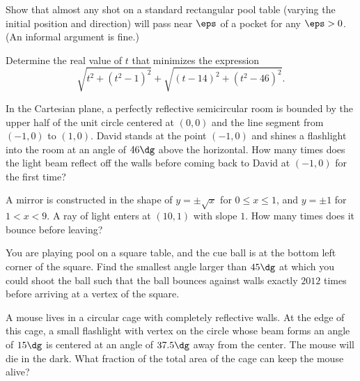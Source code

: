 \documentclass[11pt]{scrartcl}
\begin{document}
\begin{problem}
    Show that almost any shot on a standard rectangular pool table (varying the initial position and direction) will pass near $\eps$ of a pocket for any $\eps > 0$. (An informal argument is fine.)
\end{problem}

\begin{problem} %
    Determine the real value of $t$ that minimizes the expression
    \[\sqrt{t^2 + (t^2 - 1)^2} + \sqrt{(t - 14)^2 + (t^2 - 46)^2}.\]
\end{problem}

\begin{problem} %
    In the Cartesian plane, a perfectly reflective semicircular room is bounded by the upper half of the unit circle centered at $(0,0)$ and the line segment from $(-1,0)$ to $(1,0)$. David stands at the point $(-1,0)$ and shines a flashlight into the room at an angle of $46\dg$ above the horizontal. How many times does the light beam reflect off the walls before coming back to David at $(-1,0)$ for the first time?
\end{problem}

\begin{problem} %
    A mirror is constructed in the shape of $y = \pm\sqrt x$ for $0 \le x \le 1$, and $y = \pm 1$ for $1 < x < 9$. A ray of light enters at $(10,1)$ with slope $1$. How many times does it bounce before leaving?
\end{problem}

\begin{problem} %
    You are playing pool on a square table, and the cue ball is at the bottom left corner of the square. Find the smallest angle larger than $45\dg$ at which you could shoot the ball such that the ball bounces against walls exactly $2012$ times before arriving at a vertex of the square.
\end{problem}

\begin{problem} %
    A mouse lives in a circular cage with completely reflective walls. At the edge of this cage, a small flashlight with vertex on the circle whose beam forms an angle of $15\dg$ is centered at an angle of $37.5\dg$ away from the center. The mouse will die in the dark. What fraction of the total area of the cage can keep the mouse alive?
\end{problem}
\end{document}
